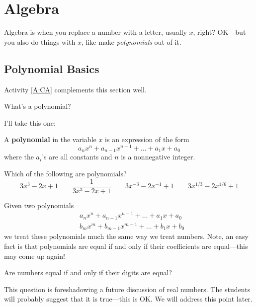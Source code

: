\section{Algebra}



Algebra is when you replace a number with a letter, usually $x$,
right? OK---but you also do things with $x$, like make
\textit{polynomials} out of it.

\subsection{Polynomial Basics}

\begin{activitynote}
Activity \ref{A:CA} complements this section well.  %
\end{activitynote}



\begin{question} What's a polynomial? 
\end{question}
\QM

I'll take this one:
\begin{definition}
A \textbf{polynomial} in the variable $x$ is an expression of the form
\[
a_nx^n + a_{n-1}x^{n-1} + \dots + a_1 x + a_0
\]
where the $a_i$'s are all constants and $n$ is a nonnegative integer.
\end{definition}

\begin{question}
Which of the following are polynomials?
\[
3x^3 - 2x + 1 \qquad \frac{1}{3x^3 - 2x + 1} \qquad 3x^{-3} - 2x^{-1} + 1 \qquad 3x^{1/3} - 2x^{1/6} + 1
\]
\end{question}
\QM


Given two polynomials
\begin{align*}
&a_nx^n + a_{n-1}x^{n-1} + \dots + a_1 x + a_0 \\
&b_mx^m + b_{m-1}x^{m-1} + \dots + b_1 x + b_0
\end{align*}
we treat these polynomials much the same way we treat numbers. Note,
an easy fact is that polynomials are equal if and only if their
coefficients are equal---this may come up again!

\begin{question} Are numbers equal if and only if their digits are equal?
\end{question}
\QM

\begin{teachingnote}
This question is foreshadowing a future discussion of real numbers. The
students will probably suggest that it is true---this is OK. We will
address this point later.
\end{teachingnote}

